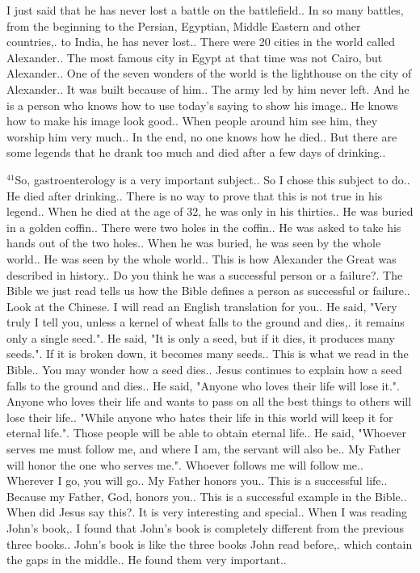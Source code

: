 \documentclass{book}
\begin{document}
I just said that he has never lost a battle on the battlefield..
In so many battles, from the beginning to the Persian, Egyptian, Middle Eastern and other countries,.
to India, he has never lost..
There were 20 cities in the world called Alexander..
The most famous city in Egypt at that time was not Cairo, but Alexander..
One of the seven wonders of the world is the lighthouse on the city of Alexander..
It was built because of him..
The army led by him never left. And he is a person who knows how to use today's saying to show his image..
He knows how to make his image look good..
When people around him see him, they worship him very much..
In the end, no one knows how he died..
But there are some legends that he drank too much and died after a few days of drinking..

$^{41}$So, gastroenterology is a very important subject..
So I chose this subject to do..
He died after drinking..
There is no way to prove that this is not true in his legend..
When he died at the age of 32, he was only in his thirties..
He was buried in a golden coffin..
There were two holes in the coffin..
He was asked to take his hands out of the two holes..
When he was buried, he was seen by the whole world..
He was seen by the whole world..
This is how Alexander the Great was described in history..
Do you think he was a successful person or a failure?.
The Bible we just read tells us how the Bible defines a person as successful or failure..
Look at the Chinese. I will read an English translation for you..
He said, "Very truly I tell you, unless a kernel of wheat falls to the ground and dies,.
it remains only a single seed.".
He said, "It is only a seed, but if it dies, it produces many seeds.".
If it is broken down, it becomes many seeds..
This is what we read in the Bible..
You may wonder how a seed dies..
Jesus continues to explain how a seed falls to the ground and dies..
He said, "Anyone who loves their life will lose it.".
Anyone who loves their life and wants to pass on all the best things to others will lose their life..
"While anyone who hates their life in this world will keep it for eternal life.".
Those people will be able to obtain eternal life..
He said, "Whoever serves me must follow me, and where I am, the servant will also be..
My Father will honor the one who serves me.".
Whoever follows me will follow me..
Wherever I go, you will go..
My Father honors you..
This is a successful life..
Because my Father, God, honors you..
This is a successful example in the Bible..
When did Jesus say this?.
It is very interesting and special..
When I was reading John's book,.
I found that John's book is completely different from the previous three books..
John's book is like the three books John read before,.
which contain the gaps in the middle..
He found them very important..
\end{document}
